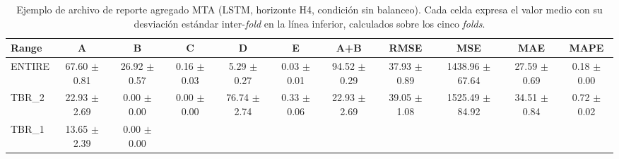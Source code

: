 \begin{table}[htbp]
\centering
\caption{Ejemplo de archivo de reporte agregado MTA (LSTM, horizonte H4, condición sin balanceo). Cada celda expresa el valor medio con su desviación estándar inter-\textit{fold} en la línea inferior, calculados sobre los cinco \textit{folds}.}
\label{tab:ejemplo_mta_report}
\small
\renewcommand{\arraystretch}{1.6}
\begin{tabular}{lcccccccccc}
\toprule
\textbf{Range}
  & \textbf{A} & \textbf{B} & \textbf{C} & \textbf{D} & \textbf{E}
  & \textbf{A+B} & \textbf{RMSE} & \textbf{MSE} & \textbf{MAE} & \textbf{MAPE} \\
\midrule
ENTIRE
  & \shortstack{67.60\\\scriptsize$\pm$0.81}
  & \shortstack{26.92\\\scriptsize$\pm$0.57}
  & \shortstack{0.16\\\scriptsize$\pm$0.03}
  & \shortstack{5.29\\\scriptsize$\pm$0.27}
  & \shortstack{0.03\\\scriptsize$\pm$0.01}
  & \shortstack{94.52\\\scriptsize$\pm$0.29}
  & \shortstack{37.93\\\scriptsize$\pm$0.89}
  & \shortstack{1438.96\\\scriptsize$\pm$67.64}
  & \shortstack{27.59\\\scriptsize$\pm$0.69}
  & \shortstack{0.18\\\scriptsize$\pm$0.00} \\
TBR\_2
  & \shortstack{22.93\\\scriptsize$\pm$2.69}
  & \shortstack{0.00\\\scriptsize$\pm$0.00}
  & \shortstack{0.00\\\scriptsize$\pm$0.00}
  & \shortstack{76.74\\\scriptsize$\pm$2.74}
  & \shortstack{0.33\\\scriptsize$\pm$0.06}
  & \shortstack{22.93\\\scriptsize$\pm$2.69}
  & \shortstack{39.05\\\scriptsize$\pm$1.08}
  & \shortstack{1525.49\\\scriptsize$\pm$84.92}
  & \shortstack{34.51\\\scriptsize$\pm$0.84}
  & \shortstack{0.72\\\scriptsize$\pm$0.02} \\
TBR\_1
  & \shortstack{13.65\\\scriptsize$\pm$2.39}
  & \shortstack{0.00\\\scriptsize$\pm$0.00}

\end{tabular}
\end{table}
